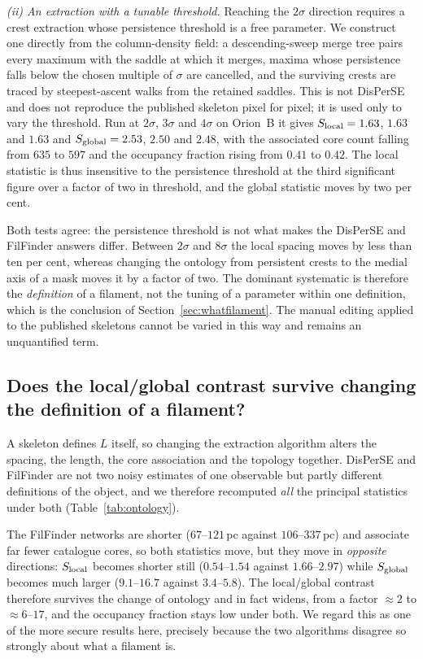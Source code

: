 \documentclass[usenatbib,twoside,twocolumn]{mnras}
\begin{document}
\smallskip\noindent\emph{(ii) An extraction with a tunable threshold.} Reaching the $2\sigma$ direction requires a crest extraction whose persistence threshold is a free parameter. We construct one directly from the column-density field: a descending-sweep merge tree pairs every maximum with the saddle at which it merges, maxima whose persistence falls below the chosen multiple of $\sigma$ are cancelled, and the surviving crests are traced by steepest-ascent walks from the retained saddles. This is not DisPerSE and does not reproduce the published skeleton pixel for pixel; it is used only to vary the threshold. Run at $2\sigma$, $3\sigma$ and $4\sigma$ on Orion~B it gives $S_{\rm local}=1.63$, $1.63$ and $1.63$ and $S_{\rm global}=2.53$, $2.50$ and $2.48$, with the associated core count falling from $635$ to $597$ and the occupancy fraction rising from $0.41$ to $0.42$. The local statistic is thus insensitive to the persistence threshold at the third significant figure over a factor of two in threshold, and the global statistic moves by two per cent.

\smallskip\noindent Both tests agree: the persistence threshold is not what makes the DisPerSE and FilFinder answers differ. Between $2\sigma$ and $8\sigma$ the local spacing moves by less than ten per cent, whereas changing the ontology from persistent crests to the medial axis of a mask moves it by a factor of two. The dominant systematic is therefore the \emph{definition} of a filament, not the tuning of a parameter within one definition, which is the conclusion of Section~\ref{sec:whatfilament}. The manual editing applied to the published skeletons cannot be varied in this way and remains an unquantified term.

\subsection{Does the local/global contrast survive changing the definition of a filament?}
\label{sec:ontology}

A skeleton defines $L$ itself, so changing the extraction algorithm alters the spacing, the length, the core association and the topology together. DisPerSE and FilFinder are not two noisy estimates of one observable but partly different definitions of the object, and we therefore recomputed \emph{all} the principal statistics under both (Table~\ref{tab:ontology}).

The FilFinder networks are shorter ($67$--$121$\,pc against $106$--$337$\,pc) and associate far fewer catalogue cores, so both statistics move, but they move in \emph{opposite} directions: $S_{\rm local}$ becomes shorter still ($0.54$--$1.54$ against $1.66$--$2.97$) while $S_{\rm global}$ becomes much larger ($9.1$--$16.7$ against $3.4$--$5.8$). The local/global contrast therefore survives the change of ontology and in fact widens, from a factor $\approx2$ to $\approx6$--$17$, and the occupancy fraction stays low under both. We regard this as one of the more secure results here, precisely because the two algorithms disagree so strongly about what a filament is.
\end{document}
